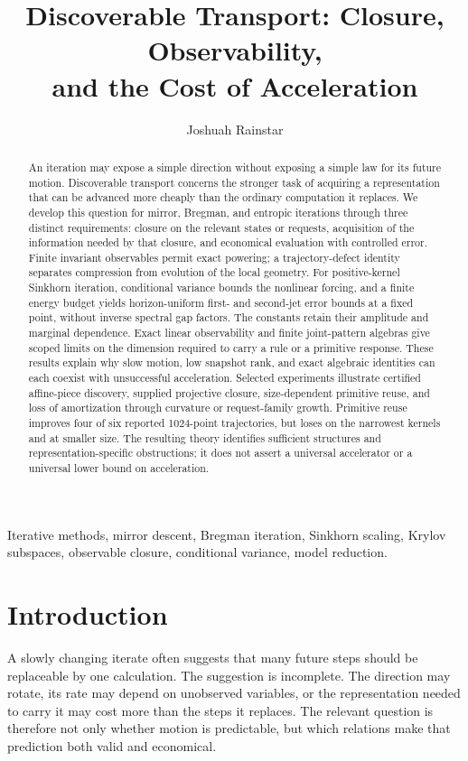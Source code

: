 \documentclass[journal]{IEEEtran}
\title{Discoverable Transport: Closure, Observability,\\and the Cost of Acceleration}
\author{Joshuah Rainstar}
\date{}
\theoremstyle{definition}
\begin{document}
\maketitle
\begin{abstract}
An iteration may expose a simple direction without exposing a simple law for
its future motion. Discoverable transport concerns the stronger task of
acquiring a representation that can be advanced more cheaply than the
ordinary computation it replaces. We develop this question for mirror,
Bregman, and entropic iterations through three distinct requirements:
closure on the relevant states or requests, acquisition of the information
needed by that closure, and economical evaluation with controlled error.
Finite invariant observables permit exact powering; a trajectory-defect
identity separates compression from evolution of the local geometry.
For positive-kernel Sinkhorn iteration, conditional variance bounds the
nonlinear forcing, and a finite energy budget yields horizon-uniform
first- and second-jet error bounds at a fixed point, without inverse spectral
gap factors. The constants retain their amplitude and marginal dependence.
Exact linear observability and finite joint-pattern algebras give scoped
limits on the dimension required to carry a rule or a primitive response.
These results explain why slow motion, low snapshot rank, and exact
algebraic identities can each coexist with unsuccessful acceleration.
Selected experiments illustrate certified affine-piece discovery, supplied
projective closure, size-dependent primitive reuse, and loss of amortization
through curvature or request-family growth. Primitive reuse improves four of
six reported 1024-point trajectories, but loses on the narrowest kernels
and at smaller size. The resulting theory identifies
sufficient structures and representation-specific obstructions; it does not
assert a universal accelerator or a universal lower bound on acceleration.
\end{abstract}
\begin{IEEEkeywords}
Iterative methods, mirror descent, Bregman iteration, Sinkhorn scaling,
Krylov subspaces, observable closure, conditional variance, model reduction.
\end{IEEEkeywords}

\section{Introduction}
A slowly changing iterate often suggests that many future steps should be
replaceable by one calculation. The suggestion is incomplete. The direction
may rotate, its rate may depend on unobserved variables, or the representation
needed to carry it may cost more than the steps it replaces. The relevant
question is therefore not only whether motion is predictable, but which
relations make that prediction both valid and economical.
\end{document}
